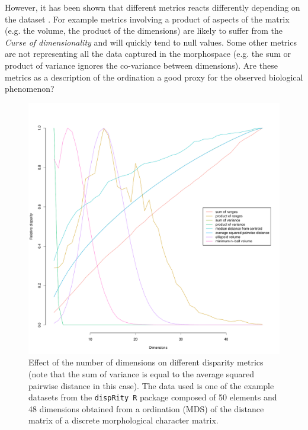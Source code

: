 \documentclass[12pt,letterpaper]{article}
\begin{document}
However, it has been shown that different metrics reacts differently depending on the dataset \citep[][; and an anecdotal example in Fig. \ref{Fig:DimensionsEffect}]{Wills2001,Ciampaglio2001}.
For example metrics involving a product of aspects of the matrix (e.g. the volume, the product of the dimensions) are likely to suffer from the \textit{Curse of dimensionality} \citep{bellman1957dynamic} and will quickly tend to null values.
Some other metrics are not representing all the data captured in the morphospace (e.g. the sum or product of variance ignores the co-variance between dimensions).
Are these metrics as a description of the ordination a good proxy for the observed biological phenomenon?


\begin{figure}[!htbp]
\centering
   \includegraphics[width=1\textwidth]{Figures/DimensionsEffect.pdf} 
\caption{Effect of the number of dimensions on different disparity metrics (note that the sum of variance is equal to the average squared pairwise distance in this case).
The data used is one of the example datasets from the \texttt{dispRity R} package \citep[\texttt{BeckLee\_mat50};][]{beckancient2014,dispRityv02} composed of 50 elements and 48 dimensions obtained from a ordination (MDS) of the distance matrix of a discrete morphological character matrix.}
\label{Fig:DimensionsEffect}
\end{figure}
\end{document}
